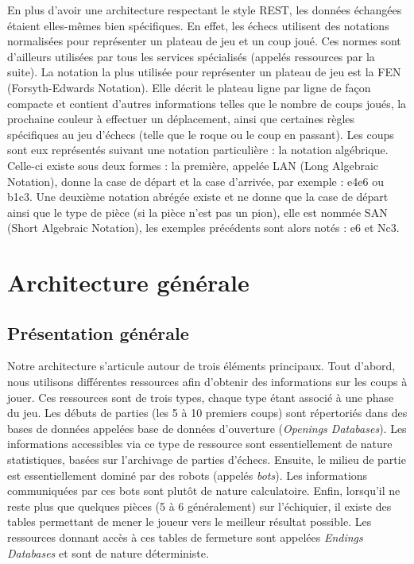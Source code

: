 \documentclass[a4paper,11pt]{article}
\begin{document}
En plus d'avoir une architecture respectant le style REST, les données échangées étaient elles-mêmes bien spécifiques. En effet, les échecs utilisent des notations normalisées pour représenter un plateau de jeu et un coup joué. Ces normes sont d'ailleurs utilisées par tous les services spécialisés (appelés ressources par la suite). La notation la plus utilisée pour représenter un plateau de jeu est la FEN (Forsyth-Edwards Notation). Elle décrit le plateau ligne par ligne de façon compacte et contient d'autres informations telles que le nombre de coups joués, la prochaine couleur à effectuer un déplacement, ainsi que certaines règles spécifiques au jeu d'échecs (telle que le roque ou le coup en passant). Les coups sont eux représentés suivant une notation particulière : la notation algébrique. Celle-ci existe sous deux formes : la première, appelée LAN (Long Algebraic Notation), donne la case de départ et la case d'arrivée, par exemple : e4e6 ou b1c3. Une deuxième notation abrégée existe et ne donne que la case de départ ainsi que le type de pièce (si la pièce n'est pas un pion), elle est nommée SAN (Short Algebraic Notation), les exemples précédents sont alors notés : e6 et Nc3.


\section{Architecture générale}

\subsection{Présentation générale}
Notre architecture s'articule autour de trois éléments principaux. Tout d'abord, nous utilisons différentes ressources afin d'obtenir des informations sur les coups à jouer. Ces ressources sont de trois types, chaque type étant associé à une phase du jeu. Les débuts de parties (les 5 à 10 premiers coups) sont répertoriés dans des bases de données appelées base de données d'ouverture ({\it Openings Databases}). Les informations accessibles via ce type de ressource sont essentiellement de nature statistiques, basées sur l'archivage de parties d'échecs. Ensuite, le milieu de partie est essentiellement dominé par des robots (appelés {\it bots}). Les informations communiquées par ces bots sont plutôt de nature calculatoire. Enfin, lorsqu'il ne reste plus que quelques pièces (5 à 6 généralement) sur l'échiquier, il existe des tables permettant de mener le joueur vers le meilleur résultat possible. Les ressources donnant accès à ces tables de fermeture sont appelées {\it Endings Databases} et sont de nature déterministe.
\end{document}
